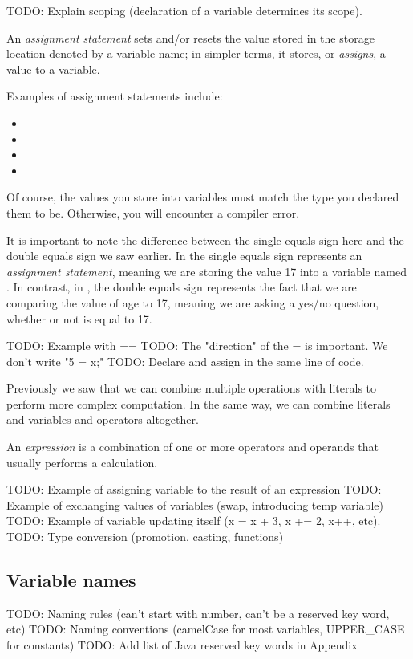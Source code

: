 TODO: Explain scoping (declaration of a variable determines its scope).

\begin{definition}
An \emph{assignment statement} sets and/or resets the value stored in the storage location denoted by a variable name; in simpler terms, it stores, or \emph{assigns}, a value to a variable.
\end{definition}

\noindent Examples of assignment statements include:
\begin{itemize}
 \item {}
 \item {}
 \item {}
 \item {}
\end{itemize}
Of course, the values you store into variables must match the type you declared them to be. Otherwise, you will encounter a compiler error. 

It is important to note the difference between the single equals sign here and the double equals sign we saw earlier. In  the single equals sign represents an \emph{assignment statement}, meaning we are storing the value 17 into a variable named . In contrast, in , the double equals sign represents the fact that we are comparing the value of age to 17, meaning we are asking a yes/no question, whether or not  is equal to 17. 

TODO: Example with ==
TODO: The "direction" of the = is important. We don't write "5 = x;"
TODO: Declare and assign in the same line of code.

Previously we saw that we can combine multiple operations with literals to perform more complex computation. In the same way, we can combine literals and variables and operators altogether.

\begin{definition}
An \emph{expression} is a combination of one or more operators and operands that usually performs a calculation.
\end{definition}

TODO: Example of assigning variable to the result of an expression
TODO: Example of exchanging values of variables (swap, introducing temp variable)
TODO: Example of variable updating itself (x = x + 3, x += 2, x++, etc).
TODO: Type conversion (promotion, casting, functions)

\subsection{Variable names}
TODO: Naming rules (can't start with number, can't be a reserved key word, etc)
TODO: Naming conventions (camelCase for most variables, UPPER_CASE for constants)
TODO: Add list of Java reserved key words in Appendix

